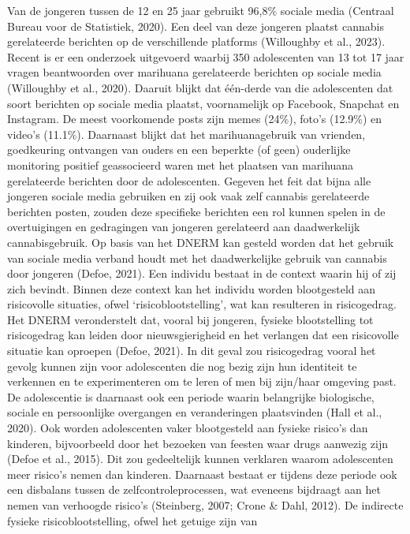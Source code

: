 \documentclass[
  letterpaper,
  DIV=11,
  numbers=noendperiod]{scrartcl}
\begin{document}
Van de jongeren tussen de 12 en 25 jaar gebruikt 96,8\% sociale media
(Centraal Bureau voor de Statistiek, 2020). Een deel van deze jongeren
plaatst cannabis gerelateerde berichten op de verschillende platforms
(Willoughby et al., 2023). Recent is er een onderzoek uitgevoerd waarbij
350 adolescenten van 13 tot 17 jaar vragen beantwoorden over marihuana
gerelateerde berichten op sociale media (Willoughby et al., 2020).
Daaruit blijkt dat één-derde van die adolescenten dat soort berichten op
sociale media plaatst, voornamelijk op Facebook, Snapchat en Instagram.
De meest voorkomende posts zijn memes (24\%), foto's (12.9\%) en video's
(11.1\%). Daarnaast blijkt dat het marihuanagebruik van vrienden,
goedkeuring ontvangen van ouders en een beperkte (of geen) ouderlijke
monitoring positief geassocieerd waren met het plaatsen van marihuana
gerelateerde berichten door de adolescenten. Gegeven het feit dat bijna
alle jongeren sociale media gebruiken en zij ook vaak zelf cannabis
gerelateerde berichten posten, zouden deze specifieke berichten een rol
kunnen spelen in de overtuigingen en gedragingen van jongeren
gerelateerd aan daadwerkelijk cannabisgebruik. Op basis van het DNERM
kan gesteld worden dat het gebruik van sociale media verband houdt met
het daadwerkelijke gebruik van cannabis door jongeren (Defoe, 2021). Een
individu bestaat in de context waarin hij of zij zich bevindt. Binnen
deze context kan het individu worden blootgesteld aan risicovolle
situaties, ofwel `risicoblootstelling', wat kan resulteren in
risicogedrag. Het DNERM veronderstelt dat, vooral bij jongeren, fysieke
blootstelling tot risicogedrag kan leiden door nieuwsgierigheid en het
verlangen dat een risicovolle situatie kan oproepen (Defoe, 2021). In
dit geval zou risicogedrag vooral het gevolg kunnen zijn voor
adolescenten die nog bezig zijn hun identiteit te verkennen en te
experimenteren om te leren of men bij zijn/haar omgeving past. De
adolescentie is daarnaast ook een periode waarin belangrijke
biologische, sociale en persoonlijke overgangen en veranderingen
plaatsvinden (Hall et al., 2020). Ook worden adolescenten vaker
blootgesteld aan fysieke risico's dan kinderen, bijvoorbeeld door het
bezoeken van feesten waar drugs aanwezig zijn (Defoe et al., 2015). Dit
zou gedeeltelijk kunnen verklaren waarom adolescenten meer risico's
nemen dan kinderen. Daarnaast bestaat er tijdens deze periode ook een
disbalans tussen de zelfcontroleprocessen, wat eveneens bijdraagt aan
het nemen van verhoogde risico's (Steinberg, 2007; Crone \& Dahl, 2012).
De indirecte fysieke risicoblootstelling, ofwel het getuige zijn van
\end{document}

